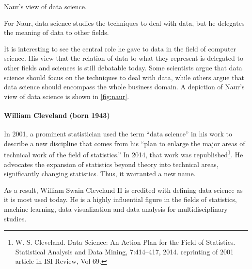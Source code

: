 \begin{figurebox}[label=fig:naur]{Naur's view of data science.}
  \centering
  \tcblower
    For Naur, data science studies the techniques to deal
    with data, but he delegates the meaning of data to other fields.
\end{figurebox}

It is interesting to see the central role he gave to data in the field of computer
science. His view that the relation of data to what they represent is delegated to other
fields and sciences is still debatable today.  Some scientists argue that data science
should focus on the techniques to deal with data, while others argue that data science
should encompass the whole business domain.  A depiction of Naur's view of data science is
shown in \cref{fig:naur}.

\def\clevelandds{(0,0) circle (20mm)}
\def\clevelandst{(0:-5mm) circle (15mm)}
\def\clevelandde {(2,1) circle (15mm)}
\def\clevelandcs {(2,-1) circle (15mm)}

\paragraph{William Cleveland (born 1943)}

In 2001, a prominent statistician used the term ``data science'' in his work to describe a
new discipline that comes from his ``plan to enlarge the major areas of technical work of
the field of statistics.''
In 2014, that work was republished\footnote{W. S. Cleveland.
Data Science: An Action Plan for the Field of Statistics. Statistical Analysis and Data
Mining, 7:414–417, 2014. reprinting of 2001 article in ISI Review, Vol 69.}.
He advocates the expansion of statistics beyond theory into technical areas, significantly
changing statistics.  Thus, it warranted a new name.

As a result, William Swain Cleveland II is credited with defining data science as it is most
used today. He is a highly influential figure in the fields of statistics, machine
learning, data visualization and data analysis for multidisciplinary studies.

